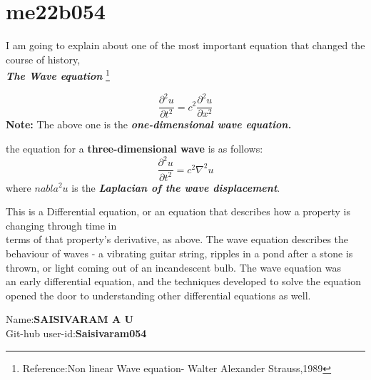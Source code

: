 
\section{me22b054}
I am going to explain about one of the most important equation that changed the course of history, \\ \textbf{\textit{The Wave equation}} \footnote{Reference:Non linear Wave equation- Walter Alexander Strauss,1989}

\begin{equation}
\frac{\partial^2 u}{\partial t^2} = c^2 \frac{\partial^2 u}{\partial x^2}
\end{equation}
 \textbf{Note:} The above one is the \textbf{\textit{one-dimensional wave equation.}}
 
 the equation for a \textbf{three-dimensional wave } is as follows:
 \begin{equation}
 \frac{\partial^2 u}{\partial t^2} = c^2 \nabla^2 u
 \end{equation}
  where \textbf{$nabla^2 u$} is the \textbf{\textit{Laplacian of the wave displacement}}.
  
  
 This is a Differential equation, or an equation that describes how a property is changing through time in \\ terms of that property's  derivative, as above. The wave equation describes the \\ behaviour  of waves - a vibrating guitar string, ripples in a pond after a stone is \\ thrown,  or light coming out of an incandescent bulb. The wave equation was \\ an  early differential equation, and the techniques developed to solve the equation \\ opened the door to understanding other differential equations as well.\par
 
 
 Name:\textbf{SAISIVARAM A U} \\
 Git-hub user-id:\textbf{Saisivaram054}

 
 
